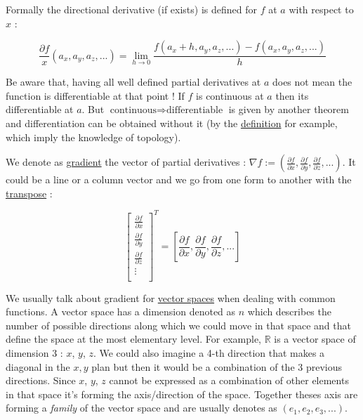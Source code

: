 \documentclass[12pt]{article}
\begin{document}
Formally the directional derivative (if exists) is defined for $f$ at $a$ with respect to $x$ :

$$
\frac{\partial{f}}{x}(a_x, a_y, a_z, ...) = \lim_{ h \to 0} \frac{f(a_x+h, a_y, a_z, ...)-f(a_x, a_y, a_z, ...)}{h}
$$

Be aware that, having all well defined partial derivatives at $a$ does not mean the function is differentiable at that point ! If $f$ is continuous at $a$ then its differentiable at $a$. But $\text{continuous} \Rightarrow \text{differentiable}$ is given by another theorem and differentiation can be obtained without it (by the \href{https://en.wikipedia.org/wiki/Differentiable_function}{definition} for example, which imply the knowledge of topology).

We denote as \href{https://en.wikipedia.org/wiki/Gradient}{gradient} the vector of partial derivatives : $ \nabla f := (\frac{\partial{f}}{\partial{x}}, \frac{\partial{f}}{\partial{y}}, \frac{\partial{f}}{\partial{z}},...)$. It could be a line or a column vector and we go from one form to another with the \href{https://en.wikipedia.org/wiki/Transpose}{transpose} : 

$$
\begin{bmatrix}
    \frac{\partial{f}}{\partial{x}} \\
    \frac{\partial{f}}{\partial{y}} \\
    \frac{\partial{f}}{\partial{z}} \\
    \vdots \\
\end{bmatrix}^T = [\frac{\partial{f}}{\partial{x}}, \frac{\partial{f}}{\partial{y}}, \frac{\partial{f}}{\partial{z}},...]
$$

We usually talk about gradient for \href{https://en.wikipedia.org/wiki/Vector_spac}{vector spaces} when dealing with common functions. A vector space has a dimension denoted as $n$ which describes the number of possible directions along which we could move in that space and that define the space at the most elementary level. For example, $\mathbb{R}$ is a vector space of dimension 3 : $x$, $y$, $z$. We could also imagine a 4-th direction that makes a diagonal in the $x,y$ plan but then it would be a combination of the 3 previous directions. Since $x$, $y$, $z$ cannot be expressed as a combination of other elements in that space it's forming the axis/direction of the space. Together theses axis are forming a {\it family} of the vector space and are usually denotes as $(e_1, e_2, e_3, ...)$. 
\end{document}
